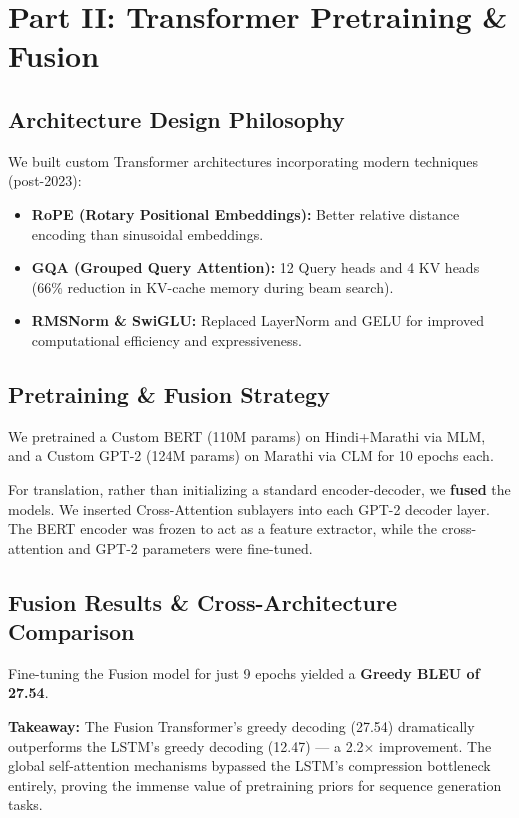 \documentclass[11pt, a4paper]{article}
\begin{document}
\section{Part II: Transformer Pretraining \& Fusion}

\subsection{Architecture Design Philosophy}
We built custom Transformer architectures incorporating modern techniques (post-2023):
\begin{itemize}
    \item \textbf{RoPE (Rotary Positional Embeddings):} Better relative distance encoding than sinusoidal embeddings.
    \item \textbf{GQA (Grouped Query Attention):} 12 Query heads and 4 KV heads (66\% reduction in KV-cache memory during beam search).
    \item \textbf{RMSNorm \& SwiGLU:} Replaced LayerNorm and GELU for improved computational efficiency and expressiveness.
\end{itemize}

\subsection{Pretraining \& Fusion Strategy}
We pretrained a Custom BERT (110M params) on Hindi+Marathi via MLM, and a Custom GPT-2 (124M params) on Marathi via CLM for 10 epochs each. 

For translation, rather than initializing a standard encoder-decoder, we \textbf{fused} the models. We inserted Cross-Attention sublayers into each GPT-2 decoder layer. The BERT encoder was frozen to act as a feature extractor, while the cross-attention and GPT-2 parameters were fine-tuned.

\subsection{Fusion Results \& Cross-Architecture Comparison}
Fine-tuning the Fusion model for just 9 epochs yielded a \textbf{Greedy BLEU of 27.54}.

\textbf{Takeaway:} The Fusion Transformer's greedy decoding (27.54) dramatically outperforms the LSTM's greedy decoding (12.47) --- a 2.2$\times$ improvement. The global self-attention mechanisms bypassed the LSTM's compression bottleneck entirely, proving the immense value of pretraining priors for sequence generation tasks.
\end{document}
